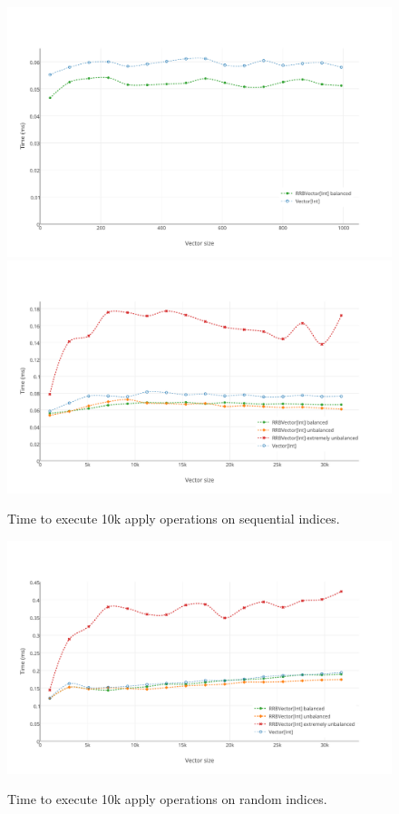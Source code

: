 \begin{figure}[h!]
  \centering
  \includegraphics[width=\textwidth]{Benchmarks/Apply_2.pdf}
  \includegraphics[width=\textwidth]{Benchmarks/Apply_3.pdf}
  \label{ApplyBenchmarks}
  \caption{Time to execute 10k apply operations on sequential indices.}
\end{figure}

\begin{figure}[h!]
  \centering
  \includegraphics[width=\textwidth]{Benchmarks/Apply_random_3.pdf}
  \label{ApplyRandomBenchmarks}
  \caption{Time to execute 10k apply operations on random indices.}
\end{figure}

